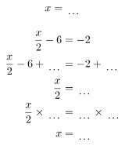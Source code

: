\documentclass[12pt]{article}
\newcounter{minipagecount}
\begin{document}
\begin{multicols}{2}
\begin{minipage}[t]{0.45\textwidth}
\begin{align*}
        x &= \dotuline{\hspace{5mm}}\\
    \end{align*}
\end{minipage} %
\noindent{(\theminipagecount)}\hspace{0.1mm} %
\begin{minipage}[t]{0.45\textwidth} %
    \vspace{-26pt}  %
    \raggedright %
    \begin{align*} %
        \frac{x}{2} - 6 &= -2\\
        \frac{x}{2} - 6 + \dotuline{\hspace{5mm}} &= -2 + \dotuline{\hspace{5mm}}\\
        \frac{x}{2} &= \dotuline{\hspace{5mm}}\\
        \frac{x}{2} \times\dotuline{\hspace{5mm}} &= \dotuline{\hspace{5mm}} \times\dotuline{\hspace{5mm}}\\
        x &= \dotuline{\hspace{5mm}}\\
    \end{align*}
\end{minipage} %
\noindent{(\theminipagecount)}\hspace{0.1mm} %
\begin{minipage}[t]{0.45\textwidth} %
    \vspace{-26pt}  %

\end{minipage}
\end{multicols}
\end{document}
